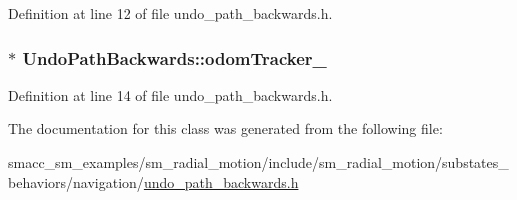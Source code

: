Definition at line 12 of file undo\+\_\+path\+\_\+backwards.\+h.

\subsubsection[{\texorpdfstring{odom\+Tracker\+\_\+}{odomTracker_}}]{$\ast$ Undo\+Path\+Backwards\+::odom\+Tracker\+\_\+\hspace{0.3cm}{\ttfamily [private]}}\hypertarget{classUndoPathBackwards_a7700dd293e08d1383f9e9247329480bc}{}\label{classUndoPathBackwards_a7700dd293e08d1383f9e9247329480bc}


Definition at line 14 of file undo\+\_\+path\+\_\+backwards.\+h.



The documentation for this class was generated from the following file\+:\begin{DoxyCompactItemize}
\item 
smacc\+\_\+sm\+\_\+examples/sm\+\_\+radial\+\_\+motion/include/sm\+\_\+radial\+\_\+motion/substates\+\_\+behaviors/navigation/\hyperlink{undo__path__backwards_8h}{undo\+\_\+path\+\_\+backwards.\+h}\end{DoxyCompactItemize}
